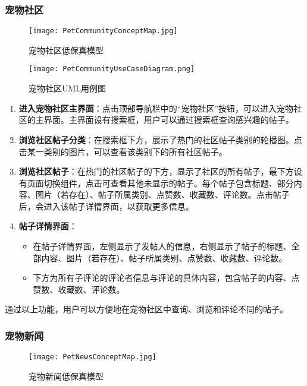 \subsubsection{宠物社区}

\begin{figure}[H]
	\centering
	\texttt{[image: PetCommunityConceptMap.jpg]}
	\caption{宠物社区低保真模型}
	\label{PetCommunityConceptMap}
\end{figure}

\begin{figure}[H]
	\centering
	\texttt{[image: PetCommunityUseCaseDiagram.png]}
	\caption{宠物社区UML用例图}
	\label{UserInterfaceConceptMap}
\end{figure}

\begin{enumerate}
	\item \textbf{进入宠物社区主界面}：点击顶部导航栏中的“宠物社区”按钮，可以进入宠物社区的主界面。主界面设有搜索框，用户可以通过搜索框查询感兴趣的帖子。
	\item \textbf{浏览社区帖子分类}：在搜索框下方，展示了热门的社区帖子类别的轮播图。点击某一类别的图片，可以查看该类别下的所有社区帖子。
	\item \textbf{浏览社区帖子}：在热门的社区帖子的下方，显示了社区的所有帖子，最下方设有页面切换组件，点击可查看其他未显示的帖子。每个帖子包含标题、部分内容、图片（若存在）、帖子所属类别、点赞数、收藏数、评论数。点击帖子后，会进入该帖子详情界面，以获取更多信息。
	\item \textbf{帖子详情界面}：
	\begin{itemize}
		\item 在帖子详情界面，左侧显示了发帖人的信息，右侧显示了帖子的标题、全部内容、图片（若存在）、帖子所属类别、点赞数、收藏数、评论数。
		\item 下方为所有子评论的评论者信息与评论的具体内容，包含帖子的内容、点赞数、收藏数、评论数。
	\end{itemize}
\end{enumerate}

通过以上功能，用户可以方便地在宠物社区中查询、浏览和评论不同的帖子。

\subsubsection{宠物新闻}

\begin{figure}[H]
	\centering
	\texttt{[image: PetNewsConceptMap.jpg]}
	\caption{宠物新闻低保真模型}
	\label{PetNewsConceptMap}
\end{figure}

